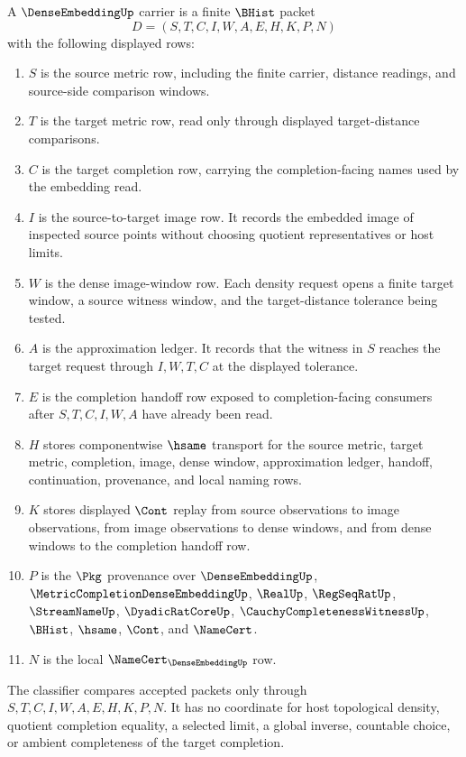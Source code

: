 \begin{definition}\label{def:dense-embedding-carrier}
A $\DenseEmbeddingUp$ carrier is a finite $\BHist$ packet
$$
D=(S,T,C,I,W,A,E,H,K,P,N)
$$
with the following displayed rows:
\begin{enumerate}
\item $S$ is the source metric row, including the finite carrier, distance readings, and source-side comparison windows.
\item $T$ is the target metric row, read only through displayed target-distance comparisons.
\item $C$ is the target completion row, carrying the completion-facing names used by the embedding read.
\item $I$ is the source-to-target image row. It records the embedded image of inspected source points without choosing quotient representatives or host limits.
\item $W$ is the dense image-window row. Each density request opens a finite target window, a source witness window, and the target-distance tolerance being tested.
\item $A$ is the approximation ledger. It records that the witness in $S$ reaches the target request through $I,W,T,C$ at the displayed tolerance.
\item $E$ is the completion handoff row exposed to completion-facing consumers after $S,T,C,I,W,A$ have already been read.
\item $H$ stores componentwise $\hsame$ transport for the source metric, target metric, completion, image, dense window, approximation ledger, handoff, continuation, provenance, and local naming rows.
\item $K$ stores displayed $\Cont$ replay from source observations to image observations, from image observations to dense windows, and from dense windows to the completion handoff row.
\item $P$ is the $\Pkg$ provenance over $\DenseEmbeddingUp$, $\MetricCompletionDenseEmbeddingUp$, $\RealUp$, $\RegSeqRatUp$, $\StreamNameUp$, $\DyadicRatCoreUp$, $\CauchyCompletenessWitnessUp$, $\BHist$, $\hsame$, $\Cont$, and $\NameCert$.
\item $N$ is the local $\NameCert_{\DenseEmbeddingUp}$ row.
\end{enumerate}
The classifier compares accepted packets only through $S,T,C,I,W,A,E,H,K,P,N$. It has no coordinate for host topological density, quotient completion equality, a selected limit, a global inverse, countable choice, or ambient completeness of the target completion.
\end{definition}

